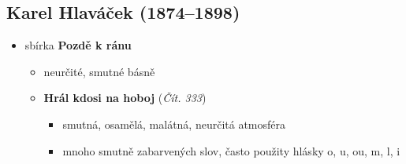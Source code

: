 \subsection{Karel Hlaváček (1874--1898)}
\begin{itemize}

\item sbírka \textbf{Pozdě k ránu}
	\begin{itemize}
	\item neurčité, smutné básně
	\item \textbf{Hrál kdosi na hoboj} (\textit{Čít. 333})
		\begin{itemize}
		\item smutná, osamělá, malátná, neurčitá atmosféra
		\item mnoho smutně zabarvených slov, často použity hlásky o, u, ou, m, l, i
		\end{itemize}
	\end{itemize}
\end{itemize}

